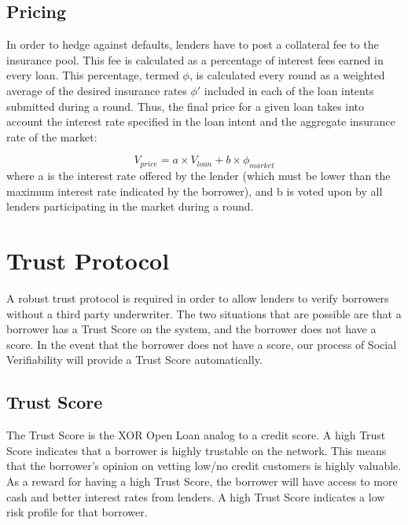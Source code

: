 \documentclass[twoside]{article}
\begin{document}
\subsection{Pricing}
In order to hedge against defaults, lenders have to post a collateral fee to the insurance pool. This fee is calculated as a percentage of interest fees earned in every loan. This percentage, termed $\phi$, is calculated every round as a weighted average of the desired insurance rates $\phi\prime$ included in each of the loan intents submitted during a round. Thus, the final price for a given loan takes into account the interest rate specified in the loan intent and the aggregate insurance rate of the market:

\begin{equation}
V_{price} = a\times V_{loan} + b\times \phi_{market}
\end{equation}
where a is the interest rate offered by the lender (which must be lower than the maximum interest rate indicated by the borrower), and b is voted upon by all lenders participating in the market during a round. 

\section{Trust Protocol}
A robust trust protocol is required in order to allow lenders to verify borrowers without a third party underwriter. The two situations that are possible are that a borrower has a Trust Score on the system, and the borrower does not have a score. In the event that the borrower does not have a score, our process of Social Verifiability will provide a Trust Score automatically. 
\subsection{Trust Score}
The Trust Score is the XOR Open Loan analog to a credit score. A high Trust Score indicates that a borrower is highly trustable on the network. This means that the borrower's opinion on vetting low/no credit customers is highly valuable. As a reward for having a high Trust Score, the borrower will have access to more cash and better interest rates from lenders. A high Trust Score indicates a low risk profile for that borrower. 
\end{document}
